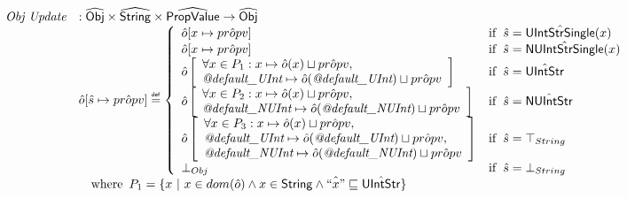 \documentclass{article}
\newcommand{\SF}[1]{\mbox{\textsf{#1}}}
\newcommand{\wherec}[1]{{\rm where}\begin{array}[t]{l}#1\end{array}}
\newcommand{\ifc}[1]{{\rm if}\begin{array}[t]{l}#1\end{array}}
\newcommand{\abs}[1]{\widehat{\SF{#1}}}
\newcommand{\aObj}{\abs{Obj}}
\newcommand{\defi}{\stackrel{\tiny \SF{def}}{=}}
\begin{document}
\[
\begin{array}{ll}
\textit{Obj Update} & : \aObj \times \abs{String} \times \abs{PropValue} \rightarrow \aObj \\
& \hat{o}[\hat{s} \mapsto \hat{propv}] \defi 
 \left\{
       \begin{array}{ll}
         \hat{o}[x \mapsto \hat{propv}]
         & \ifc{\hat{s} = \hat{\SF{UIntStrSingle}}(x) }\\
         \hat{o}[x \mapsto \hat{propv}]
         & \ifc{\hat{s} = \hat{\SF{NUIntStrSingle}}(x) }\\
         \hat{o}
         \left[
           \begin{array}{l}
           \forall x \in P_1 : x \mapsto \hat{o}(x) \sqcup \hat{propv},\\
           \emph{@default\_UInt} \mapsto \hat{o}(\emph{@default\_UInt}) \sqcup \hat{propv}\\
           \end{array}
         \right]
         & \ifc{\hat{s} = \hat{\SF{UIntStr}} }\\
         \hat{o}
         \left[
           \begin{array}{l}
           \forall x \in P_2 : x \mapsto \hat{o}(x) \sqcup \hat{propv},\\
           \emph{@default\_NUInt} \mapsto \hat{o}(\emph{@default\_NUInt}) \sqcup \hat{propv}\\
           \end{array}
         \right]
         & \ifc{\hat{s} = \hat{\SF{NUIntStr}} }\\
         \hat{o}
         \left[
           \begin{array}{l}
           \forall x \in P_3 : x \mapsto \hat{o}(x) \sqcup \hat{propv},\\
           \emph{@default\_UInt} \mapsto \hat{o}(\emph{@default\_UInt}) \sqcup \hat{propv},\\
           \emph{@default\_NUInt} \mapsto \hat{o}(\emph{@default\_NUInt}) \sqcup \hat{propv}\\
           \end{array}
         \right]
         & \ifc{\hat{s} = \top_{String} }\\
         \bot_{Obj}
         &\ifc{\hat{s} = \bot_{String} }\\
       \end{array}
     \right.\\
& \quad\wherec{
   P_1 = \{ x\ |\ x \in dom(\hat{o}) \land x \in \SF{String} \land \hat{``x"} \sqsubseteq \hat{\SF{UIntStr}}\}\\
}
\end{array}\]
\end{document}
